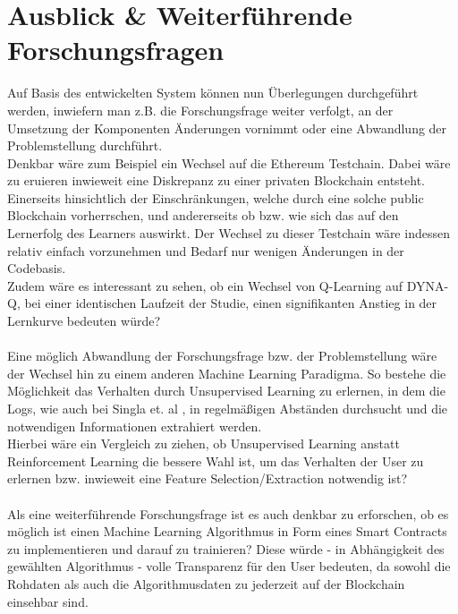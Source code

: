 \section{Ausblick \& Weiterf\"uhrende Forschungsfragen}
\label{sec:weiterforschen}
Auf Basis des entwickelten System können nun Überlegungen durchgeführt werden, inwiefern man z.B. die Forschungsfrage weiter verfolgt, an der Umsetzung der Komponenten Änderungen vornimmt oder eine Abwandlung der Problemstellung durchführt. \\
Denkbar wäre zum Beispiel ein Wechsel auf die Ethereum Testchain. Dabei wäre zu eruieren inwieweit eine Diskrepanz zu einer privaten Blockchain entsteht. Einerseits hinsichtlich der Einschränkungen, welche durch eine solche public Blockchain vorherrschen, und andererseits ob bzw. wie sich das auf den Lernerfolg des Learners auswirkt. Der Wechsel zu dieser Testchain wäre indessen relativ einfach vorzunehmen und Bedarf nur wenigen Änderungen in der Codebasis. \\ Zudem wäre es interessant zu sehen, ob ein Wechsel von Q-Learning auf DYNA-Q, bei einer identischen Laufzeit der Studie, einen signifikanten Anstieg in der Lernkurve bedeuten würde?\\\\
Eine möglich Abwandlung der Forschungsfrage bzw. der Problemstellung wäre der Wechsel hin zu einem anderen Machine Learning Paradigma. So bestehe die Möglichkeit das Verhalten durch Unsupervised Learning zu erlernen, in dem die Logs, wie auch bei Singla et. al \cite{Singla:MLSDPUB}, in regelmäßigen Abständen durchsucht und die notwendigen Informationen extrahiert werden. \\
Hierbei wäre ein Vergleich zu ziehen, ob Unsupervised Learning anstatt Reinforcement Learning die bessere Wahl ist, um das Verhalten der User zu erlernen bzw. inwieweit eine Feature Selection/Extraction notwendig ist?\\\\
Als eine weiterführende Forschungsfrage ist es auch denkbar zu erforschen, ob es möglich ist einen Machine Learning Algorithmus in Form eines Smart Contracts zu implementieren und darauf zu trainieren? Diese  würde - in Abhängigkeit des gewählten Algorithmus - volle Transparenz für den User bedeuten, da sowohl die Rohdaten als auch die Algorithmusdaten zu jederzeit auf der Blockchain einsehbar sind.